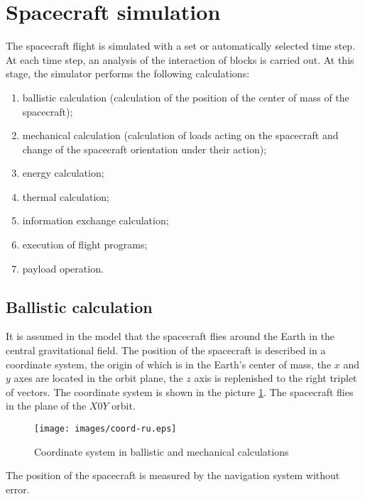 \documentclass[12pt,a4paper]{article}
\begin{document}
\section{Spacecraft simulation}

The spacecraft flight is simulated with a set or automatically selected time step. At each time step, an analysis of the interaction of blocks is carried out. At this stage, the simulator performs the following calculations:

\begin{enumerate}
   \item ballistic calculation (calculation of the position of the center of mass of the spacecraft);
   \item mechanical calculation (calculation of loads acting on the spacecraft and change of the spacecraft orientation under their action);
   \item energy calculation;
   \item thermal calculation;
   \item information exchange calculation;
   \item execution of flight programs;
   \item payload operation.
\end{enumerate}

\subsection{Ballistic calculation}
\label{Sec:Ballistics}

It is assumed in the model that the spacecraft flies around the Earth in the central gravitational field. The position of the spacecraft is described in a coordinate system, the origin of which is in the Earth's center of mass, the $x$ and $y$ axes are located in the orbit plane, the $z$ axis is replenished to the right triplet of vectors. The coordinate system is shown in the picture \ref{Pic:Coord}. The spacecraft flies in the plane of the $X0Y$ orbit.

\begin{figure}[tbh]
  \begin{center}
    \texttt{[image: images/coord-ru.eps]}
    \caption{Coordinate system in ballistic and mechanical calculations}
    \label{Pic:Coord}
  \end{center}
\end{figure}

The position of the spacecraft is measured by the navigation system without error.
\end{document}
